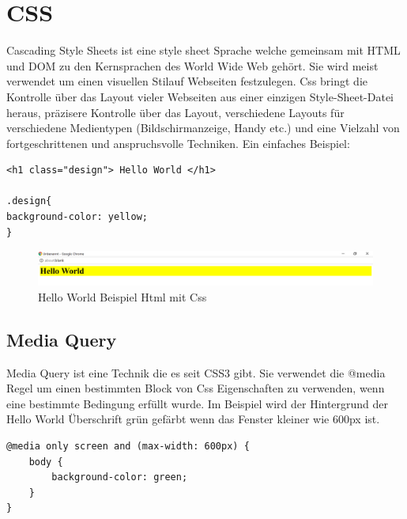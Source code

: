 \section{CSS}
Cascading Style Sheets ist eine style sheet Sprache welche gemeinsam mit HTML und DOM zu den Kernsprachen des World Wide Web gehört.
Sie wird meist verwendet um einen visuellen Stilauf Webseiten festzulegen.
Css bringt die Kontrolle über das Layout vieler Webseiten aus einer einzigen Style-Sheet-Datei heraus, präzisere Kontrolle über das Layout, verschiedene Layouts für verschiedene Medientypen (Bildschirmanzeige, Handy etc.) und eine Vielzahl von fortgeschrittenen und anspruchsvolle Techniken.
Ein einfaches Beispiel:
\begin{lstlisting}
<h1 class="design"> Hello World </h1>

.design{
background-color: yellow;
}
\end{lstlisting}

\begin{figure}[H]
\begin{center}
	\includegraphics[scale=.6]{images/Css.png}
\end{center}
	\caption{Hello World Beispiel Html mit Css}
	\label{fig:sample}
\end{figure}
\pagebreak 
\subsection{Media Query}
Media Query ist eine Technik die es seit CSS3 gibt.
Sie verwendet die @media Regel um einen bestimmten Block von Css Eigenschaften zu verwenden, wenn eine bestimmte Bedingung erfüllt wurde. Im Beispiel wird der Hintergrund der Hello World Überschrift grün gefärbt wenn das Fenster kleiner wie 600px ist.

\begin{lstlisting}
@media only screen and (max-width: 600px) {
    body {
        background-color: green;
    }
}
\end{lstlisting}

